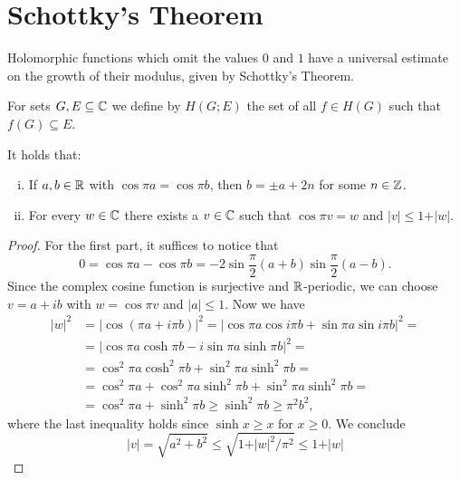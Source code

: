 \section{Schottky's Theorem}
\label{sec:schottkys-theorem}

Holomorphic functions which omit the values $0$ and $1$ have a universal estimate on the growth of their modulus, given by Schottky's Theorem.

For sets $G, E \subseteq \mathbb{C}$ we define by $H(G; E)$ the set of all $f \in H(G)$ such that $f(G) \subseteq E$.

\begin{lemma} \label{lem:schottky-1}
    It holds that:
    \begin{enumerate}[i.]
        \item If $a, b \in \mathbb{R}$ with $\cos \pi a = \cos \pi b$, then $b = \pm a + 2n$ for some $n \in \mathbb{Z}$.
        \item For every $w \in \mathbb{C}$ there exists a $v \in \mathbb{C}$ such that $\cos \pi v = w$ and $\vert v \vert \leq 1 + \vert w \vert$.
    \end{enumerate}
\end{lemma}

\begin{proof}
    For the first part, it suffices to notice that
    $$ 0 = \cos \pi a - \cos \pi b = \textstyle -2 \sin \frac{\pi}{2} ( a + b ) \sin \frac{\pi}{2} ( a - b ). $$
    Since the complex cosine function is surjective and $\mathbb{R}$-periodic, we can choose $v = a + i b$ with $w = \cos \pi v$ and $\vert a \vert \leq 1$. Now we have
    \begin{align*}
        \vert w \vert^2 &= \vert \cos (\pi a + i \pi b) \vert^2 = \vert \cos \pi a \cos i \pi b + \sin \pi a \sin i \pi b \vert^2 = \\
        &= \vert \cos \pi a \cosh \pi b - i \sin \pi a \sinh \pi b \vert^2 = \\
        &= \cos^2 \pi a \cosh^2 \pi b + \sin^2 \pi a \sinh^2 \pi b = \\
        &= \cos^2 \pi a + \cos^2 \pi a \sinh^2 \pi b + \sin^2 \pi a \sinh^2 \pi b = \\
        &= \cos^2 \pi a + \sinh^2 \pi b \geq \sinh^2 \pi b \geq \pi^2 b^2,
    \end{align*}
    where the last inequality holds since $\sinh x \geq x$ for $x \geq 0$. We conclude
    \begin{equation*}
        \vert v \vert = \sqrt{a^2 + b^2} \leq \sqrt{1 + \vert w \vert^2 / \pi^2} \leq 1 + \vert w \vert
    \end{equation*}
\end{proof}

